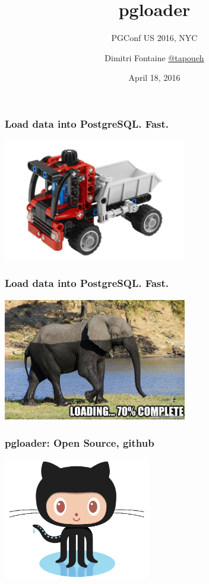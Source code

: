 \documentclass{beamer}
\title{pgloader}
\subtitle{PGConf US 2016, NYC}
\author{Dimitri Fontaine \linebreak \url{@tapoueh}}
\date{April 18, 2016}
\begin{document}
\frame{\titlepage}

\begin{frame}
  \frametitle{Load data into PostgreSQL. Fast.}


  \begin{center}
    \includegraphics[height=2.1in]{pgloader.jpg}
  \end{center}
\end{frame}

\begin{frame}
  \frametitle{Load data into PostgreSQL. Fast.}


  \begin{center}
    \includegraphics[height=2.1in]{elephant-loading.jpg}
  \end{center}
\end{frame}

\begin{frame}
  \frametitle{pgloader: Open Source, github}


  \begin{center}
    \includegraphics[height=2.1in]{Octocat.png}
  \end{center}
\end{frame}
\end{document}
